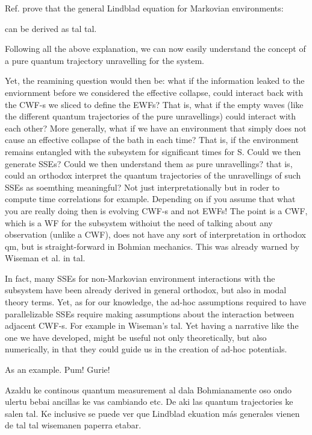 \documentclass[11pt, a4paper]{article} %
\begin{document}
Ref. \cite{mostGeneralMarkovian} prove that the general Lindblad equation for Markovian environments:


can be derived as tal tal.

Following all the above explanation, we can now easily understand the concept of a pure quantum trajectory unravelling for the system. 



Yet, the reamining question would then be: what if the information leaked to the enviornment before we considered the effective collapse, could interact back with the CWF-s we sliced to define the EWFs? That is, what if the empty waves (like the different quantum trajectories of the pure unravellings) could interact with each other? More generally, what if we have an environment that simply does not cause an effective collapse of the bath in each time? That is, if the environment remains entangled with the subsystem for significant times for S. Could we then generate SSEs? Could we then understand them as pure unravellings? that is, could an orthodox interpret the quantum trajectories of the unravellings of such SSEs as soemthing meaningful? Not just interpretationally but in roder to compute time correlations for example. 
Depending on if you assume that what you are really doing then is evolving CWF-s and not EWFs! The point is a CWF, which is a WF for the subsystem withoiut the need of talking about any observation (unlike a CWF), does not have any sort of interpretation in orthodox qm, but is straight-forward in Bohmian mechanics. This was already warned by Wiseman et al. in tal.

In fact, many SSEs for non-Markovian environment interactions with the subsystem have been already derived in general orthodox, but also in modal theory terms. Yet, as for our knowledge, the ad-hoc assumptions required to have parallelizable SSEs require making assumptions about the interaction between adjacent CWF-s. For example in Wiseman's tal. Yet having a narrative like the one we have developed, might be useful not only theoretically, but also numerically, in that they could guide us in the creation of ad-hoc potentials.

As an example. Pum! Gurie!


\newpage
Azaldu ke continous quantum measurement al dala Bohmianamente oso ondo ulertu bebai ancillas ke vas cambiando etc. De aki las quantum trajectories ke salen tal. 
Ke inclusive se puede ver que Lindblad ekuation más generales vienen de tal tal wisemanen paperra etabar.
\end{document}
